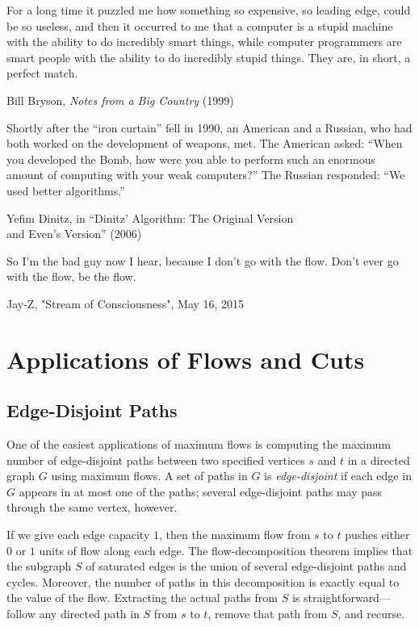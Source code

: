 \epigraph{For a long time it puzzled me how something so expensive, so leading edge, could be so
useless, and then it occurred to me that a computer is a stupid machine with the ability
to do incredibly smart things, while computer programmers are smart people with the
ability to do incredibly stupid things. They are, in short, a perfect match.
}{Bill Bryson, \textit{Notes from a Big Country} (1999)}

\epigraph{Shortly after the “iron curtain” fell in 1990, an American and a Russian, who had both
worked on the development of weapons, met. The American asked: “When you
developed the Bomb, how were you able to perform such an enormous amount of
computing with your weak computers?” The Russian responded: “We used better
algorithms.”
}{Yefim Dinitz, in “Dinitz’ Algorithm: The Original Version\\and Even’s Version” (2006)}

\epigraph{So I’m the bad guy now I hear, because I don’t go with the flow.
Don’t ever go with the flow, be the flow.
}{Jay-Z, "Stream of Consciousness", May 16, 2015}

\chapter{Applications of Flows and Cuts}
\label{ch:11}

\section{Edge-Disjoint Paths}
\label{sec:11.1}

One of the easiest applications of maximum flows is computing the maximum number of edge-disjoint paths between two specified vertices $s$ and $t$ in a directed graph $G$ using maximum flows.
A set of paths in $G$ is \textit{edge-disjoint} if each edge in $G$ appears in at most one of the paths; several edge-disjoint paths may pass through the same vertex, however.

If we give each edge capacity $1$, then the maximum flow from $s$ to $t$ pushes either $0$ or $1$ units of flow along each edge.
The flow-decomposition theorem implies that the subgraph $S$ of saturated edges is the union of several edge-disjoint paths and cycles.
Moreover, the number of paths in this decomposition is exactly equal to the value of the flow.
Extracting the actual paths from $S$ is straightforward—follow any directed path in $S$ from $s$ to $t$, remove that path from $S$, and recurse.

